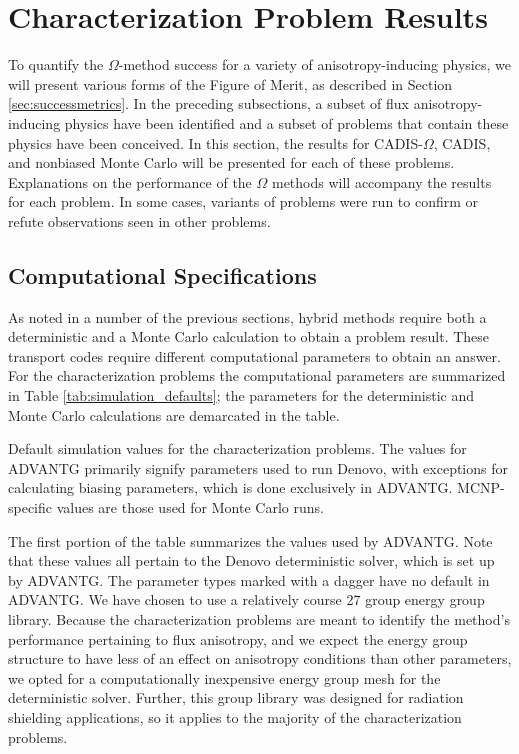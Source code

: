 \section{Characterization Problem Results}
\label{sec:CharResults}

To quantify the $\Omega$-method success for a variety of anisotropy-inducing
physics, we will present various forms of the Figure of Merit, as described in
Section \ref{sec:successmetrics}.
In the preceding subsections, a
subset of flux anisotropy-inducing physics have been identified
and a subset of problems that contain these physics have been conceived.
In this section, the results for CADIS-$\Omega$, CADIS, and nonbiased Monte Carlo
will be presented for each of these problems. Explanations on the performance of
the $\Omega$ methods will accompany the results for each problem. In some cases,
variants of problems were run to confirm or refute observations seen
in other problems.

\subsection{Computational Specifications}
\label{subsec:comp_specs}

As noted in a number of the previous sections, hybrid methods require both a
deterministic and a Monte Carlo calculation to obtain a problem result. These
transport codes require different computational parameters to obtain an answer.
For the characterization problems the computational parameters are summarized in
Table \ref{tab:simulation_defaults}; the parameters for the deterministic and
Monte Carlo calculations are demarcated in the table.

\begin{table}[h!]
  \centering
  
  \caption[Default simulation values for characterization problems.]{
    Default simulation values for the characterization problems. The values for
    ADVANTG primarily signify parameters used to run Denovo, with exceptions for
    calculating biasing parameters, which is done exclusively in ADVANTG.
    MCNP-specific values are those used for Monte Carlo runs.
  }
  \label{tab:simulation_defaults}
\end{table}

The first portion of the table summarizes the values used by ADVANTG. Note that
these values all pertain to the Denovo deterministic solver, which is set up by
ADVANTG. The parameter types marked with a dagger have no default in ADVANTG.
We have chosen to use a relatively course 27 group energy group library.
Because the characterization problems are meant to identify the method's
performance pertaining to flux anisotropy, and we expect the energy group
structure to have less of an effect on anisotropy conditions than other
parameters, we opted for a
computationally inexpensive energy group mesh for the deterministic solver.
Further, this group library was designed for radiation shielding applications,
so it applies to the majority of the characterization problems.

